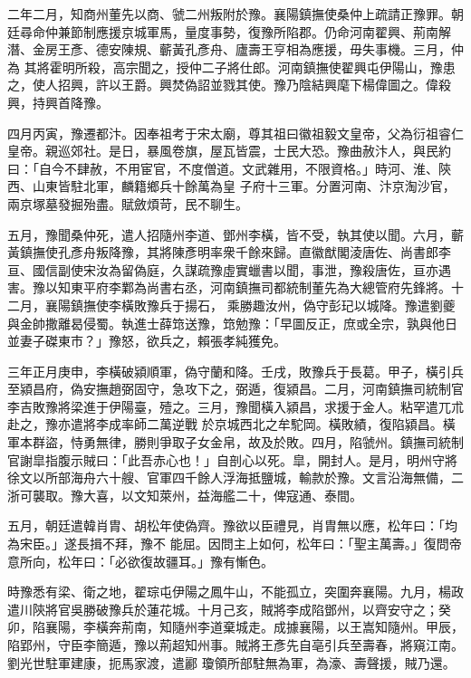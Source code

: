 \begin{pinyinscope}
 二年二月，知商州董先以商、虢二州叛附於豫。襄陽鎮撫使桑仲上疏請正豫罪。朝廷尋命仲兼節制應援京城軍馬，量度事勢，復豫所陷郡。仍命河南翟興、荊南解潛、金房王彥、德安陳規、蘄黃孔彥舟、廬壽王亨相為應援，毋失事機。三月，仲為
 其將霍明所殺，高宗聞之，授仲二子將仕郎。河南鎮撫使翟興屯伊陽山，豫患之，使人招興，許以王爵。興焚偽詔並戮其使。豫乃陰結興麾下楊偉圖之。偉殺興，持興首降豫。



 四月丙寅，豫遷都汴。因奉祖考于宋太廟，尊其祖曰徽祖毅文皇帝，父為衍祖睿仁皇帝。親巡郊社。是日，暴風卷旗，屋瓦皆震，士民大恐。豫曲赦汴人，與民約曰：「自今不肆赦，不用宦官，不度僧道。文武雜用，不限資格。」時河、淮、陝西、山東皆駐北軍，麟籍鄉兵十餘萬為皇
 子府十三軍。分置河南、汴京淘沙官，兩京塚墓發掘殆盡。賦斂煩苛，民不聊生。



 五月，豫聞桑仲死，遣人招隨州李道、鄧州李橫，皆不受，執其使以聞。六月，蘄黃鎮撫使孔彥舟叛降豫，其將陳彥明率衆千餘來歸。直徽猷閣淩唐佐、尚書郎李亘、國信副使宋汝為留偽庭，久謀疏豫虛實蠟書以聞，事泄，豫殺唐佐，亘亦遇害。豫以知東平府李鄴為尚書右丞，河南鎮撫司都統制董先為大總管府先鋒將。十二月，襄陽鎮撫使李橫敗豫兵于揚石，
 乘勝趣汝州，偽守彭玘以城降。豫遣劉夔與金帥撒離曷侵蜀。執進士薛筇送豫，筇勉豫：「早圖反正，庶或全宗，孰與他日並妻子磔東市？」豫怒，欲兵之，賴張孝純獲免。



 三年正月庚申，李橫破潁順軍，偽守蘭和降。壬戌，敗豫兵于長葛。甲子，橫引兵至潁昌府，偽安撫趙弼固守，急攻下之，弼遁，復潁昌。二月，河南鎮撫司統制官李吉敗豫將梁進于伊陽臺，殪之。三月，豫聞橫入潁昌，求援于金人。粘罕遣兀朮赴之，豫亦遣將李成率師二萬逆戰
 於京城西北之牟駝岡。橫敗績，復陷潁昌。橫軍本群盜，恃勇無律，勝則爭取子女金帛，故及於敗。四月，陷虢州。鎮撫司統制官謝皐指腹示賊曰：「此吾赤心也！」自剖心以死。皐，開封人。是月，明州守將徐文以所部海舟六十艘、官軍四千餘人浮海抵鹽城，輸款於豫。文言沿海無備，二浙可襲取。豫大喜，以文知萊州，益海艦二十，俾寇通、泰間。



 五月，朝廷遣韓肖胄、胡松年使偽齊。豫欲以臣禮見，肖胄無以應，松年曰：「均為宋臣。」遂長揖不拜，豫不
 能屈。因問主上如何，松年曰：「聖主萬壽。」復問帝意所向，松年曰：「必欲復故疆耳。」豫有慚色。



 時豫悉有梁、衛之地，翟琮屯伊陽之鳳牛山，不能孤立，突圍奔襄陽。九月，楊政遣川陝將官吳勝破豫兵於蓮花城。十月己亥，賊將李成陷鄧州，以齊安守之；癸卯，陷襄陽，李橫奔荊南，知隨州李道棄城走。成據襄陽，以王嵩知隨州。甲辰，陷郢州，守臣李簡遁，豫以荊超知州事。賊將王彥先自亳引兵至壽春，將窺江南。劉光世駐軍建康，扼馬家渡，遣酈
 瓊領所部駐無為軍，為濠、壽聲援，賊乃還。




\end{pinyinscope}
